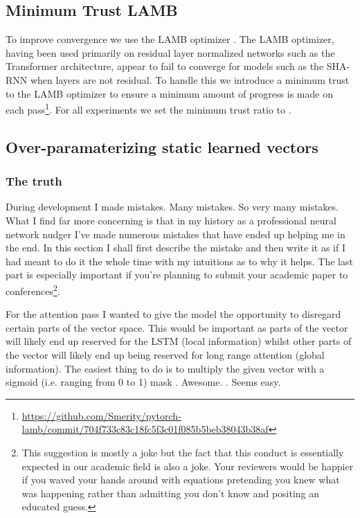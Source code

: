 \documentclass{article}
\begin{document}
\subsection{Minimum Trust LAMB}

To improve convergence we use the LAMB optimizer \citep{you2019reducing}.
The LAMB optimizer, having been used primarily on residual layer normalized networks such as the Transformer architecture, appear to fail to converge for models such as the SHA-RNN when layers are not residual.
To handle this we introduce a minimum trust to the LAMB optimizer to ensure a minimum amount of progress is made on each pass\footnote{\url{https://github.com/Smerity/pytorch-lamb/commit/704f733c83c18fc5f3c01f085b5beb38043b38af}}.
For all experiments we set the minimum trust ratio to .

\subsection{Over-paramaterizing static learned vectors}
\label{sec:opslv}

\subsubsection{The truth}

During development I made mistakes.
Many mistakes.
So very many mistakes.
What I find far more concerning is that in my history as a professional neural network nudger I've made numerous mistakes that have ended up helping me in the end.
In this section I shall first describe the mistake and then write it as if I had meant to do it the whole time with my intuitions as to why it helps.
The last part is especially important if you're planning to submit your academic paper to conferences\footnote{This suggestion is mostly a joke but the fact that this conduct is essentially expected in our academic field is also a joke. Your reviewers would be happier if you waved your hands around with equations pretending you knew what was happening rather than admitting you don't know and positing an educated guess.}.

For the attention pass I wanted to give the model the opportunity to disregard certain parts of the vector space.
This would be important as parts of the vector will likely end up reserved for the LSTM (local information) whilst other parts of the vector will likely end up being reserved for long range attention (global information).
The easiest thing to do is to multiply the given vector  with a sigmoid (i.e. ranging from 0 to 1) mask .
Awesome.
.
Seems easy.
\end{document}
